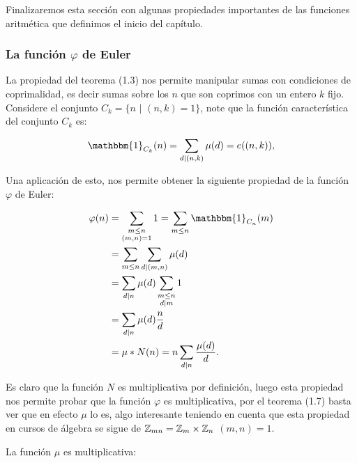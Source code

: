 Finalizaremos esta sección con algunas propiedades importantes de las funciones aritmética que definimos el inicio del capítulo.

\vspace*{-0.5cm}

\subsubsection{La función \texorpdfstring{$\varphi$}{Lg} de Euler}

La propiedad del teorema (1.3) nos permite manipular sumas  con condiciones de coprimalidad, es decir sumas sobre los $n$ que son coprimos con un entero $k$ fijo. Considere el conjunto $C_k=\{n \text{ | } (n,k)=1\}$, note que la función característica del conjunto $C_k$ es:

$$
\mathbbm{1}_{C_k}(n)=\sum_{d \mid(n, k)} \mu(d)=e((n,k)),
$$

Una aplicación de esto, nos permite obtener la siguiente propiedad de la función $\varphi$ de Euler:

$$\begin{aligned}
\varphi(n) & =\sum_{\substack{m \leq n \\
(m, n)=1}} 1=\sum_{m\leq n}\mathbbm{1}_{C_n}(m) \\
& =\sum_{m \leq n} \sum_{d \mid(m, n)} \mu(d) \\
& =\sum_{d \mid n} \mu(d) \sum_{\substack{m \leq n \\
d \mid m}} 1 \\
& =\sum_{d \mid n} \mu(d) \frac{n}{d}\\
&=\mu*N(n)=n \sum_{d \mid n} \frac{\mu(d)}{d} .
\end{aligned}$$

Es claro que la función $N$ es multiplicativa por definición, luego esta propiedad nos permite probar que la función $\varphi$ es multiplicativa, por el teorema (1.7) basta ver que en efecto $\mu$ lo es, algo interesante teniendo en cuenta que esta propiedad en cursos de álgebra se sigue de $\mathbb{Z}_{mn}=\mathbb{Z}_m\times \mathbb{Z}_n$  $(m,n)=1$.



\begin{theorem}
La función $\mu$ es multiplicativa:
\end{theorem}

